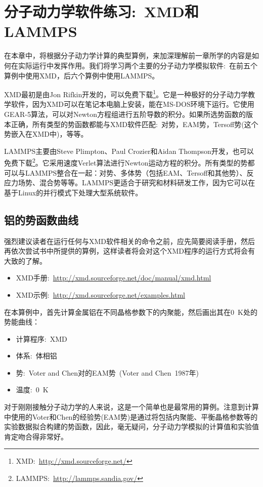 \chapter{分子动力学软件练习:~\rm{XMD}和\rm{LAMMPS}}

在本章中，将根据分子动力学计算的典型算例，来加深理解前一章所学的内容是如何在实际运行中发挥作用。我们将学习两个主要的分子动力学模拟软件:~在前五个算例中使用\textrm{XMD}，后六个算例中使用\textrm{LAMMPS}。

\textrm{XMD}最初是由\textrm{Jon Rifkin}开发的，可以免费下载\footnote{\textrm{XMD}:~\url{http://xmd.sourceforge.net/}}。它是一种极好的分子动力学教学软件，因为\textrm{XMD}可以在笔记本电脑上安装，能在\textrm{MS-DOS}环境下运行。它使用\textrm{GEAR-5}算法，可以对\textrm{Newton}方程组进行五阶导数的积分。如果所选势函数的版本正确，所有类型的势函数都能与\textrm{XMD}软件匹配:~对势，\textrm{EAM}势，\textrm{Tersoff}势(这个势嵌入在\textrm{XMD}中)，等等。

\textrm{LAMMPS}主要由\textrm{Steve Plimpton}、\textrm{Paul Crozier}和\textrm{Aidan Thompson}开发，也可以免费下载\footnote{\textrm{LAMMPS}:~\url{http://lammps.sandia.gov/}}。它采用速度\textrm{Verlet}算法进行\textrm{Newton}运动方程的积分。所有类型的势都可以与\textrm{LAMMPS}整合在一起：对势、多体势（包括\textrm{EAM}、\textrm{Tersoff}和其他势）、反应力场势、混合势等等。\textrm{LAMMPS}更适合于研究和材料研发工作，因为它可以在基于\textrm{Linux}的并行模式下处理大型系统软件。

\section{铝的势函数曲线}\label{ux94ddux7684ux52bfux51fdux6570ux66f2ux7ebf} 
强烈建议读者在运行任何与\textrm{XMD}软件相关的命令之前，应先简要阅读手册，然后再依次尝试书中所提供的算例，这样读者将会对这个\textrm{XMD}程序的运行方式将会有大致的了解。
\begin{itemize}
	\item \textrm{XMD}手册:~\url{http://xmd.sourceforge.net/doc/manual/xmd.html}
\item \textrm{XMD}示例:~\url{http://xmd.sourceforge.net/examples.html}
\end{itemize}

在本算例中，首先计算金属铝在不同晶格参数下的内聚能，然后画出其在0~\textrm{K}处的势能曲线：
\begin{itemize}
	\item 计算程序:~\textrm{XMD}
\item 体系:~体相铝
\item 势:~\textrm{Voter and Chen}对的\textrm{EAM}势~(\textrm{Voter and Chen}~\textrm{1987}年)
\item 温度:~\textrm{0~K}
\end{itemize}
对于刚刚接触分子动力学的人来说，这是一个简单也是最常用的算例。注意到计算中使用的\textrm{Voter}和\textrm{Chen}的经验势(\textrm{EAM}势)是通过将包括内聚能、平衡晶格参数等的实验数据拟合构建的势函数，因此，毫无疑问，分子动力学模拟的计算值和实验值肯定吻合得非常好。

